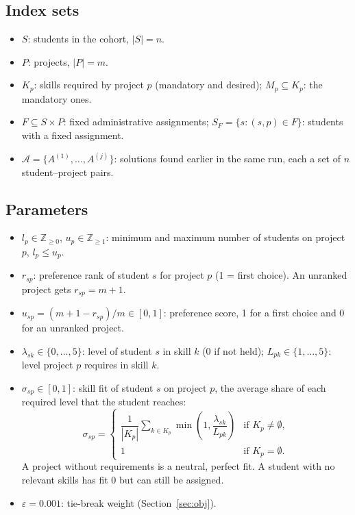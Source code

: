 \documentclass[11pt,a4paper]{article}
\begin{document}
\subsection{Index sets}
\begin{itemize}
  \item $S$: students in the cohort, $|S| = n$.
  \item $P$: projects, $|P| = m$.
  \item $K_p$: skills required by project $p$ (mandatory and desired);
        $M_p \subseteq K_p$: the mandatory ones.
  \item $F \subseteq S \times P$: fixed administrative assignments;
        $S_F = \{ s : (s,p) \in F \}$: students with a fixed assignment.
  \item $\mathcal{A} = \{A^{(1)}, \dots, A^{(j)}\}$: solutions found earlier
        in the same run, each a set of $n$ student--project pairs.
\end{itemize}

\subsection{Parameters}
\begin{itemize}
  \item $l_p \in \mathbb{Z}_{\ge 0}$, $u_p \in \mathbb{Z}_{\ge 1}$: minimum
        and maximum number of students on project $p$, $l_p \le u_p$.
  \item $r_{sp}$: preference rank of student $s$ for project $p$
        (1 = first choice). An unranked project gets $r_{sp} = m + 1$.
  \item $u_{sp} = (m + 1 - r_{sp})/m \in [0,1]$: preference score, 1 for a
        first choice and 0 for an unranked project.
  \item $\lambda_{sk} \in \{0,\dots,5\}$: level of student $s$ in skill $k$
        (0 if not held); $L_{pk} \in \{1,\dots,5\}$: level project $p$
        requires in skill $k$.
  \item $\sigma_{sp} \in [0,1]$: skill fit of student $s$ on project $p$, the
        average share of each required level that the student reaches:
        \begin{equation}
          \sigma_{sp} =
          \begin{cases}
            \dfrac{1}{|K_p|} \displaystyle\sum_{k \in K_p}
              \min\!\left(1, \dfrac{\lambda_{sk}}{L_{pk}}\right)
              & \text{if } K_p \neq \emptyset,\\[8pt]
            1 & \text{if } K_p = \emptyset.
          \end{cases}
          \label{eq:fit}
        \end{equation}
        A project without requirements is a neutral, perfect fit. A student
        with no relevant skills has fit 0 but can still be assigned.
  \item $\varepsilon = 0.001$: tie-break weight (Section~\ref{sec:obj}).
\end{itemize}
\end{document}
